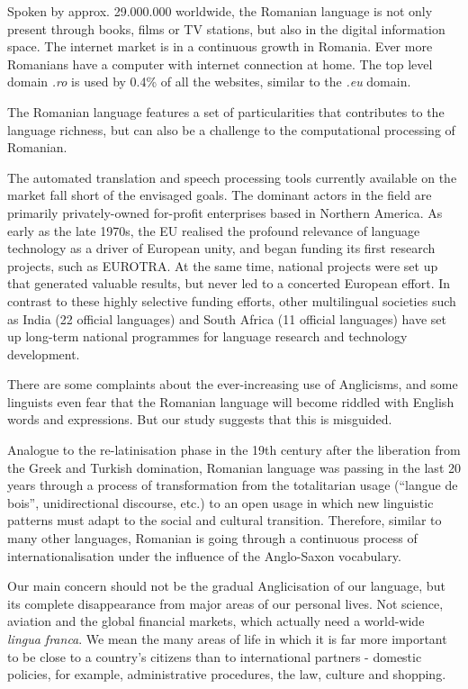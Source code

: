 \begin{multicols}{2}
Spoken by approx. 29.000.000 worldwide, the Romanian language is not only present through books, films or TV stations, but also in the digital information space. The internet market is in a continuous growth in Romania. Ever more Romanians have a computer with internet connection at home. The top level domain \textit{.ro} is used by 0.4\% of all the websites, similar to the \textit{.eu} domain.

The Romanian language features a set of particularities that contributes to the language richness, but can also be a challenge to the computational processing of Romanian.

The automated translation and speech processing tools currently available on the market fall short of the envisaged goals. The dominant actors in the field are primarily privately-owned for-profit enterprises based in Northern America.
As early as the late 1970s, the EU realised the profound relevance of language technology as a driver of European unity, and began funding its first research projects, such as EUROTRA. At the same time, national projects were set up that generated valuable results, but never led to a concerted European effort. In contrast to these highly selective funding efforts, other multilingual societies such as India (22 official languages) and South Africa (11 official languages) have set up long-term national programmes for language research and technology development. 


There are some complaints about the ever-increasing use of Anglicisms, and some linguists even fear that the Romanian language will become riddled with English words and expressions. But our study suggests that this is misguided.

Analogue to the re-latinisation phase in the 19th century after the liberation from the Greek and Turkish domination, Romanian language was passing in the last 20 years through a process of transformation from the totalitarian usage (“langue de bois”, unidirectional discourse, etc.) to an open usage in which new linguistic patterns must adapt to the social and cultural transition. Therefore, similar to many other languages, Romanian is going through a continuous process of internationalisation under the influence of the Anglo-Saxon vocabulary. 

Our main concern should not be the gradual Anglicisation of our language, but its complete disappearance from major areas of our personal lives. Not science, aviation and the global financial markets, which actually need a world-wide \textit{lingua franca}. We mean the many areas of life in which it is far more important to be close to a country’s citizens than to international partners - domestic policies, for example, administrative procedures, the law, culture and shopping.


\end{multicols}
